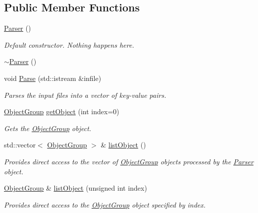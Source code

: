 \subsection*{Public Member Functions}
\begin{DoxyCompactItemize}
\item 
\hypertarget{classosea_1_1_parser_a12234f6cd36b61af4b50c94a179422c1}{\hyperlink{classosea_1_1_parser_a12234f6cd36b61af4b50c94a179422c1}{Parser} ()}\label{classosea_1_1_parser_a12234f6cd36b61af4b50c94a179422c1}

\begin{DoxyCompactList}\small\item\em Default constructor. Nothing happens here. \end{DoxyCompactList}\item 
\hyperlink{classosea_1_1_parser_a3e658b5917a93a3ef648050d060e3a93}{$\sim$\-Parser} ()
\item 
void \hyperlink{classosea_1_1_parser_a7e33e142c7b5d13943e973cc87880ee9}{Parse} (std\-::istream \&infile)
\begin{DoxyCompactList}\small\item\em Parses the input files into a vector of key-\/value pairs. \end{DoxyCompactList}\item 
\hyperlink{classosea_1_1_object_group}{Object\-Group} \hyperlink{classosea_1_1_parser_ab8e77da06e72ede97238d28bad4a9ae6}{get\-Object} (int index=0)
\begin{DoxyCompactList}\small\item\em Gets the \hyperlink{classosea_1_1_object_group}{Object\-Group} object. \end{DoxyCompactList}\item 
std\-::vector$<$ \hyperlink{classosea_1_1_object_group}{Object\-Group} $>$ \& \hyperlink{classosea_1_1_parser_a93885957453b4b7e346ee1b2b79d05f8}{list\-Object} ()
\begin{DoxyCompactList}\small\item\em Provides direct access to the vector of \hyperlink{classosea_1_1_object_group}{Object\-Group} objects processed by the \hyperlink{classosea_1_1_parser}{Parser} object. \end{DoxyCompactList}\item 
\hyperlink{classosea_1_1_object_group}{Object\-Group} \& \hyperlink{classosea_1_1_parser_ac7323370460e1373acf710cbe2014c9a}{list\-Object} (unsigned int index)
\begin{DoxyCompactList}\small\item\em Provides direct access to the \hyperlink{classosea_1_1_object_group}{Object\-Group} object specified by index. \end{DoxyCompactList}\item 

\end{DoxyCompactItemize}

